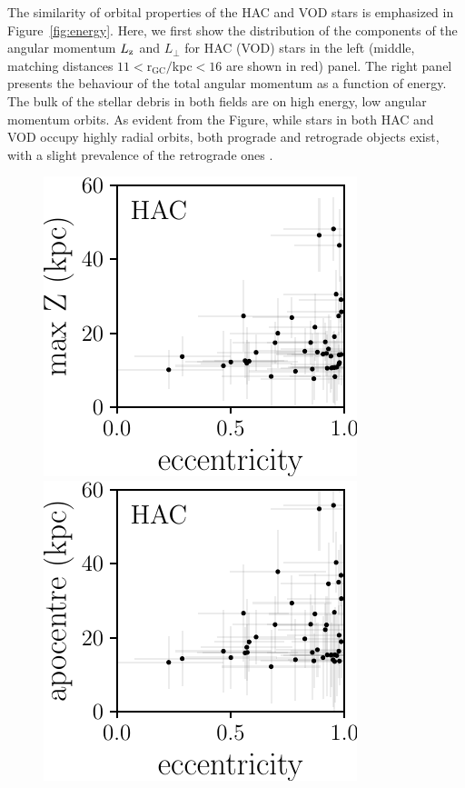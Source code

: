 \documentclass[fleqn,usenatbib]{mnras}
\begin{document}
The similarity of orbital properties of the HAC and VOD stars is
emphasized in Figure~\ref{fig:energy}. Here, we first show the
distribution of the components of the angular momentum $L_{\rm z}$ and
$L_{\perp}$ for HAC (VOD) stars in the left (middle, matching
distances $11\mathrm{<r_{GC}}/$kpc$<16$ are shown in red) panel. The
right panel presents the behaviour of the total angular momentum as a
function of energy. The bulk of the stellar debris in both fields are
on high energy, low angular momentum orbits. As evident from the
Figure, while stars in both HAC and VOD occupy highly radial orbits,
both prograde and retrograde objects exist, with a slight prevalence
of the retrograde ones \citep[see
  also][]{actionhalo,shards,Helmi2018}.
%
\begin{figure}
	\includegraphics[scale=0.473]{HAC_orbits_ecc_z.pdf}
    \includegraphics[scale=0.473]{HAC_orbits_apo_ecc.pdf} 

\end{figure}
\end{document}

